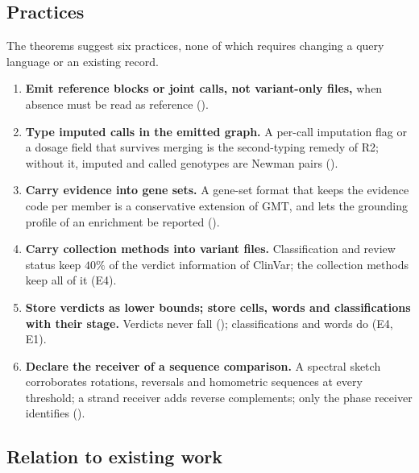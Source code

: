 \documentclass[11pt,twocolumn,a4paper]{article}
\theoremstyle{plain}
\theoremstyle{definition}
\theoremstyle{remark}
\begin{document}
\subsection{Practices}

The theorems suggest six practices, none of which requires changing a query
language or an existing record.
\begin{enumerate}
\item \textbf{Emit reference blocks or joint calls, not variant-only files,} when
  absence must be read as reference ().
\item \textbf{Type imputed calls in the emitted graph.} A per-call imputation
  flag or a dosage field that survives merging is the second-typing remedy of
  R2; without it, imputed and called genotypes are Newman pairs
  ().
\item \textbf{Carry evidence into gene sets.} A gene-set format that keeps the
  evidence code per member is a conservative extension of GMT, and lets the
  grounding profile of an enrichment be reported ().
\item \textbf{Carry collection methods into variant files.} Classification and
  review status keep $40\%$ of the verdict information of ClinVar; the
  collection methods keep all of it (E4).
\item \textbf{Store verdicts as lower bounds; store cells, words and
  classifications with their stage.} Verdicts never fall
  (); classifications and words do (E4, E1).
\item \textbf{Declare the receiver of a sequence comparison.} A spectral
  sketch corroborates rotations, reversals and homometric sequences at every
  threshold; a strand receiver adds reverse complements; only the phase
  receiver identifies ().
\end{enumerate}

\subsection{Relation to existing work}
\end{document}
